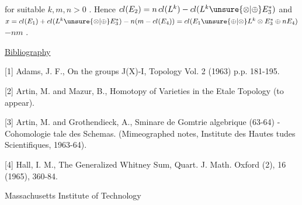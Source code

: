 
for suitable $k,m,n > 0$ . Hence $cl(E_2) = n\,cl(L^k) - cl(L^k \unsure{\otimes|\oplus} E_3^{*})$ 
and $x = cl(E_1) + cl(L^k \unsure{\otimes|\oplus} E_3^{*}) - n(m - cl(E_4)) = cl(E_1 \unsure{\oplus|\otimes} L^k \otimes E_3^{*} \oplus nE_4)$
$- nm$ .

\uline{Bibliography}

[1] Adams, J. F., On the groups J(X)-I, Topology Vol. 2 (1963)
p.p. 181-195.

[2] Artin, M. and Mazur, B., Homotopy of Varieties in the
Etale Topology (to appear).

[3] Artin, M. and Grothendieck, A., Sminare de Gomtrie
algebrique (63-64) - Cohomologie tale des Schemas.
(Mimeographed notes, Institute des Hautes tudes 
Scientifiques, 1963-64).

[4] Hall, I. M., The Generalized Whitney Sum, Quart. J. Math.
Oxford (2), 16 (1965), 360-84.

Massachusetts Institute of Technology

